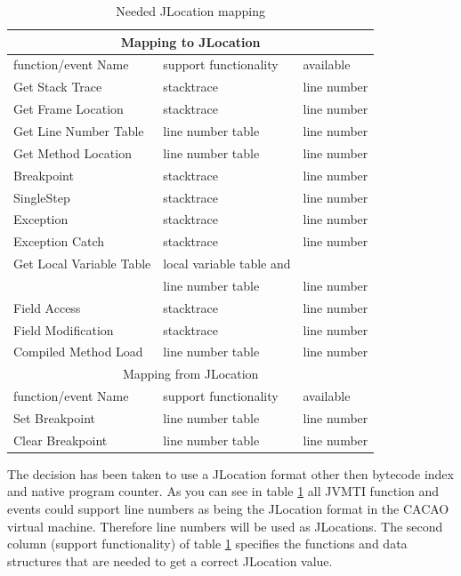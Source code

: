\begin{table}[h]
\begin{center}
\begin{tabular}{|l|l|l|}
\hline
\multicolumn{3}{|c|}{Mapping to JLocation}\\\hline
function/event Name & support functionality & available \\\hline
\hline
Get Stack Trace  & stacktrace &line number \\\hline
Get Frame Location & stacktrace & line number\\\hline %
Get Line Number Table & line number table & line number \\\hline
Get Method Location &   line number table  & line number \\\hline
Breakpoint & stacktrace  & line number \\\hline
SingleStep & stacktrace  & line number \\\hline
Exception & stacktrace   & line number \\\hline
Exception Catch & stacktrace & line number \\\hline
Get Local Variable Table & local variable table and &\\
                                    & line number table & line number \\\hline
Field Access & stacktrace & line number \\\hline
Field Modification & stacktrace & line number \\\hline
Compiled Method Load & line number table & line number \\\hline
\hline
\multicolumn{3}{|c|}{Mapping from JLocation} \\\hline
\hline
function/event Name & support functionality & available \\\hline
Set Breakpoint & line number table   & line number\\\hline
Clear Breakpoint &  line number table  & line number \\\hline
\end{tabular}
\end{center}
\caption{Needed JLocation mapping}
\label{JLocationmapping}
\end{table} 

The decision has been taken to use a JLocation format other then bytecode index and native program counter. As you can see in table \ref{JLocationmapping} all JVMTI function and events could support line numbers as being the JLocation format in the CACAO virtual machine. Therefore line numbers will be used as JLocations. The second column (support functionality) of table \ref{JLocationmapping} specifies the functions and data structures that are needed to get a correct JLocation value.

